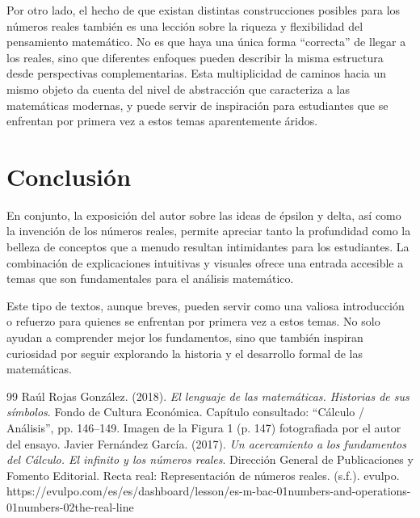\documentclass[a4paper,10pt]{article}
\begin{document}
Por otro lado, el hecho de que existan distintas construcciones posibles para los números reales también es una lección sobre la riqueza y flexibilidad del pensamiento matemático. No es que haya una única forma \enquote{correcta} de llegar a los reales, sino que diferentes enfoques pueden describir la misma estructura desde perspectivas complementarias. Esta multiplicidad de caminos hacia un mismo objeto da cuenta del nivel de abstracción que caracteriza a las matemáticas modernas, y puede servir de inspiración para estudiantes que se enfrentan por primera vez a estos temas aparentemente áridos.

\newpage

\section*{Conclusión}

En conjunto, la exposición del autor sobre las ideas de épsilon y delta, así como la invención de los números reales, permite apreciar tanto la profundidad como la belleza de conceptos que a menudo resultan intimidantes para los estudiantes. La combinación de explicaciones intuitivas y visuales ofrece una entrada accesible a temas que son fundamentales para el análisis matemático.

Este tipo de textos, aunque breves, pueden servir como una valiosa introducción o refuerzo para quienes se enfrentan por primera vez a estos temas. No solo ayudan a comprender mejor los fundamentos, sino que también inspiran curiosidad por seguir explorando la historia y el desarrollo formal de las matemáticas.

\newpage

\begin{thebibliography} {99}
	Raúl Rojas González. (2018). \emph{El lenguaje de las matemáticas. Historias de sus símbolos}.  Fondo de Cultura Económica. Capítulo consultado: “Cálculo / Análisis”, pp. 146–149. Imagen de la Figura 1 (p. 147) fotografiada por el autor del ensayo.
	Javier Fernández García. (2017). \emph{Un acercamiento a los fundamentos del Cálculo. El infinito y los números reales}. Dirección General de Publicaciones y Fomento Editorial.
	Recta real: Representación de números reales. (s.f.). evulpo. https://evulpo.com/es/es/dashboard/lesson/es-m-bac-01numbers-and-operations-01numbers-02the-real-line
\end{thebibliography}
\end{document}

